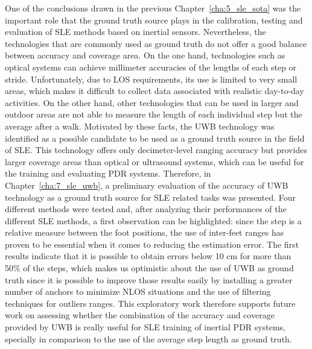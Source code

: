 One of the conclusions drawn in the previous Chapter~\ref{cha:5_sle_sota} was the important role that the ground truth source plays in the calibration, testing and evaluation of SLE methods based on inertial sensors.
Nevertheless, the technologies that are commonly used as ground truth do not offer a good balance between accuracy and coverage area.
On the one hand, technologies such as optical systems can achieve millimeter accuracies of the lengths of each step or stride. 
Unfortunately, due to LOS requirements, its use is limited to very small areas, which makes it difficult to collect data associated with realistic day-to-day activities.
On the other hand, other technologies that can be used in larger and outdoor areas are not able to measure the length of each individual step but the average after a walk.
Motivated by these facts, the UWB technology was identified as a possible candidate to be used as a ground truth source in the field of SLE.
This technology offers only decimeter-level ranging accuracy but provides larger coverage areas than optical or ultrasound systems, which can be useful for the training and evaluating PDR systems. 	 
Therefore, in Chapter~\ref{cha:7_sle_uwb}, a preliminary evaluation of the accuracy of UWB technology as a ground truth source for SLE related tasks was presented.
Four different methods were tested and, after analyzing their performances of the different SLE methods, a first observation can be highlighted: since the step is a relative measure between the foot positions, the use of inter-feet ranges has proven to be essential when it comes to reducing the estimation error.
The first results indicate that it is possible to obtain errors below 10 cm for more than 50\% of the steps, which makes us optimistic about the use of UWB as ground truth since it is possible to improve those results easily by installing a greater number of anchors to minimize NLOS situations and the use of filtering techniques for outliers ranges.
This exploratory work therefore supports future work on assessing whether the combination of the accuracy and coverage provided by UWB is really useful for SLE training of inertial PDR systems, specially in comparison to the use of the average step length as ground truth.

